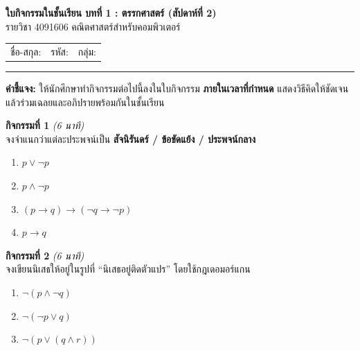 \documentclass[a4paper,12pt]{article}
\begin{document}
\thispagestyle{empty}

\begin{center}
  {\Large\bfseries\color{navy} ใบกิจกรรมในชั้นเรียน บทที่ 1 : ตรรกศาสตร์ (สัปดาห์ที่ 2)}\\[0.2em]
  {\normalsize รายวิชา 4091606 คณิตศาสตร์สำหรับคอมพิวเตอร์}
\end{center}
\vspace{0.3em}
\noindent\begin{tabular}{@{}p{} p{} p{}@{}}
  ชื่อ-สกุล: \dotfill & รหัส: \dotfill & กลุ่ม: \dotfill
\end{tabular}
\hrule
\vspace{0.6em}
\noindent\textbf{คำชี้แจง:} ให้นักศึกษาทำกิจกรรมต่อไปนี้ลงในใบกิจกรรม \textbf{ภายในเวลาที่กำหนด}
แสดงวิธีคิดให้ชัดเจน แล้วร่วมเฉลยและอภิปรายพร้อมกันในชั้นเรียน
\vspace{0.6em}

\noindent\textbf{กิจกรรมที่ 1} \hfill \textit{(6 นาที)}\\
จงจำแนกว่าแต่ละประพจน์เป็น \textbf{สัจนิรันดร์ / ข้อขัดแย้ง / ประพจน์กลาง}
\begin{enumerate}[label=\arabic*)]
  \item $p \lor \neg p$ \hfill \dotfill
  \item $p \land \neg p$ \hfill \dotfill
  \item $(p \rightarrow q) \rightarrow (\neg q \rightarrow \neg p)$ \hfill \dotfill
  \item $p \rightarrow q$ \hfill \dotfill
\end{enumerate}
\vspace{0.4em}

\noindent\textbf{กิจกรรมที่ 2} \hfill \textit{(6 นาที)}\\
จงเขียนนิเสธให้อยู่ในรูปที่ ``นิเสธอยู่ติดตัวแปร'' โดยใช้กฎเดอมอร์แกน
\begin{enumerate}[label=\arabic*)]
  \item $\neg(p \land \neg q)$ \hfill \dotfill
  \item $\neg(\neg p \lor q)$ \hfill \dotfill
  \item $\neg(p \lor (q \land r))$ \hfill \dotfill
\end{enumerate}
\vspace{0.4em}
\end{document}
